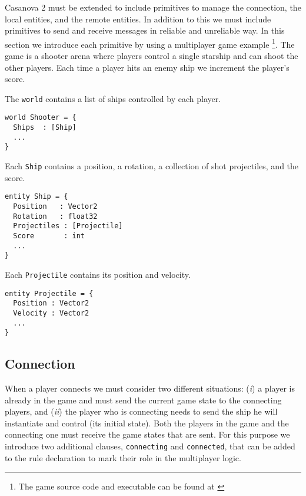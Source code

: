 Casanova 2 must be extended to include primitives to manage the connection, the local entities, and the remote entities. In addition to this we must include primitives to send and receive messages in reliable and unreliable way. In this section we introduce each primitive by using a multiplayer game example \footnote{The game source code and executable can be found at \cite{MULTIPLAER_SHOOTER}}. The game is a shooter arena where players control a single starship and can shoot the other players. Each time a player hits an enemy ship we increment the player's score.  


The \texttt{world} contains a list of ships controlled by each player.
\begin{lstlisting}
world Shooter = {
  Ships  : [Ship]
  ...
}
\end{lstlisting}

Each \texttt{Ship} contains a position, a rotation, a collection of shot projectiles, and the score.
\begin{lstlisting}
entity Ship = {
  Position   : Vector2
  Rotation   : float32
  Projectiles : [Projectile]
  Score		  : int
  ...
}

\end{lstlisting}

Each \texttt{Projectile} contains its position and velocity.

\begin{lstlisting}
entity Projectile = {
  Position : Vector2
  Velocity : Vector2
  ...
}
\end{lstlisting}

\subsection*{Connection}
When a player connects we must consider two different situations: (\textit{i}) a player is already in the game and must send the current game state to the connecting players, and (\textit{ii}) the player who is connecting needs to send the ship he will instantiate and control (its initial state). Both the players in the game and the connecting one must receive the game states that are sent. For this purpose we introduce two additional clauses, \texttt{connecting} and \texttt{connected}, that can be added to the rule declaration to mark their role in the multiplayer logic.

